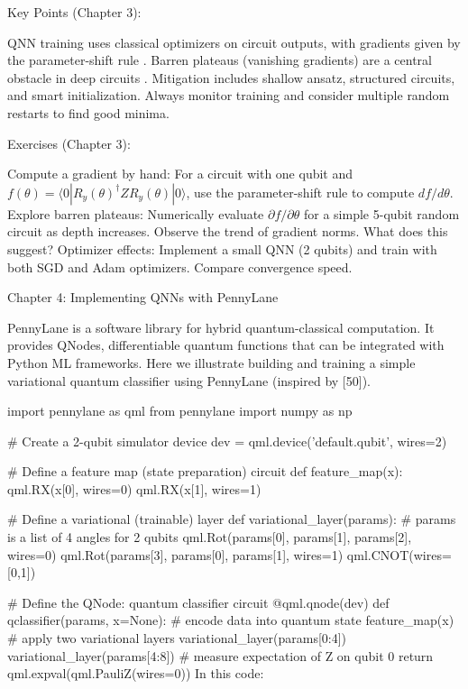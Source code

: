 Key Points (Chapter 3):



QNN training uses classical optimizers on circuit outputs, with gradients given by the parameter-shift rule .
Barren plateaus (vanishing gradients) are a central obstacle in deep circuits .
Mitigation includes shallow ansatz, structured circuits, and smart initialization.
Always monitor training and consider multiple random restarts to find good minima.




Exercises (Chapter 3):



Compute a gradient by hand: For a circuit with one qubit and $f(\theta)=\langle0|R_y(\theta)^\dagger Z R_y(\theta)|0\rangle$, use the parameter-shift rule to compute $df/d\theta$.
Explore barren plateaus: Numerically evaluate $\partial f/\partial\theta$ for a simple 5-qubit random circuit as depth increases. Observe the trend of gradient norms. What does this suggest?
Optimizer effects: Implement a small QNN (2 qubits) and train with both SGD and Adam optimizers. Compare convergence speed.






Chapter 4: Implementing QNNs with PennyLane





PennyLane is a software library for hybrid quantum-classical computation. It provides QNodes, differentiable quantum functions that can be integrated with Python ML frameworks.  Here we illustrate building and training a simple variational quantum classifier using PennyLane (inspired by [50]).

import pennylane as qml
from pennylane import numpy as np

# Create a 2-qubit simulator device
dev = qml.device('default.qubit', wires=2)

# Define a feature map (state preparation) circuit
def feature_map(x):
    qml.RX(x[0], wires=0)
    qml.RX(x[1], wires=1)

# Define a variational (trainable) layer
def variational_layer(params):
    # params is a list of 4 angles for 2 qubits
    qml.Rot(params[0], params[1], params[2], wires=0)
    qml.Rot(params[3], params[0], params[1], wires=1)
    qml.CNOT(wires=[0,1])

# Define the QNode: quantum classifier circuit
@qml.qnode(dev)
def qclassifier(params, x=None):
    # encode data into quantum state
    feature_map(x)
    # apply two variational layers
    variational_layer(params[0:4])
    variational_layer(params[4:8])
    # measure expectation of Z on qubit 0
    return qml.expval(qml.PauliZ(wires=0))
In this code:



